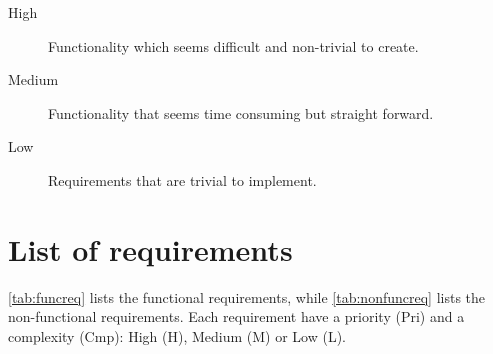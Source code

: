 \begin{description}
	\item[High] Functionality which seems difficult and non-trivial to create.
	\item[Medium] Functionality that seems time consuming but straight forward.
	\item[Low] Requirements that are trivial to implement.
\end{description}

\section{List of requirements}
\label{sec:reqslist}
\autoref{tab:funcreq} lists the functional requirements, while
\autoref{tab:nonfuncreq} lists the non-functional requirements. Each
requirement have a priority (Pri) and a complexity (Cmp): High (H), 
Medium (M) or Low (L).

